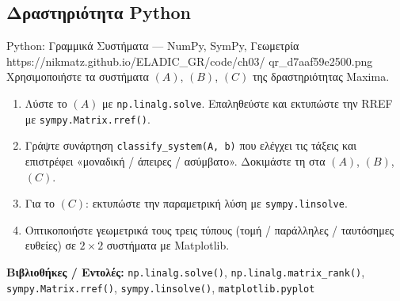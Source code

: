 \subsection*{Δραστηριότητα Python}

\begin{pybox}{Python: Γραμμικά Συστήματα — NumPy, SymPy, Γεωμετρία}%
             {https://nikmatz.github.io/ELADIC_GR/code/ch03/}%
             {qr_d7aaf59e2500.png}
\label{py:ch3_linear_systems}
Χρησιμοποιήστε τα συστήματα $(A)$, $(B)$, $(C)$ της δραστηριότητας Maxima.
\begin{enumerate}[label=(\alph*),itemsep=2pt]
  \item Λύστε το $(A)$ με \texttt{np.linalg.solve}. Επαληθεύστε και
    εκτυπώστε την RREF με \texttt{sympy.Matrix.rref()}.
  \item Γράψτε συνάρτηση \texttt{classify\_system(A, b)} που ελέγχει
    τις τάξεις και επιστρέφει «μοναδική / άπειρες / ασύμβατο».
    Δοκιμάστε τη στα $(A)$, $(B)$, $(C)$.
  \item Για το $(C)$: εκτυπώστε την παραμετρική λύση με
    \texttt{sympy.linsolve}.
  \item Οπτικοποιήστε γεωμετρικά τους τρεις τύπους (τομή / παράλληλες /
    ταυτόσημες ευθείες) σε $2\times 2$ συστήματα με Matplotlib.
\end{enumerate}
\medskip
\textbf{Βιβλιοθήκες / Εντολές:}
\texttt{np.linalg.solve()}, \texttt{np.linalg.matrix\_rank()},
\texttt{sympy.Matrix.rref()}, \texttt{sympy.linsolve()},
\texttt{matplotlib.pyplot}
\end{pybox}
